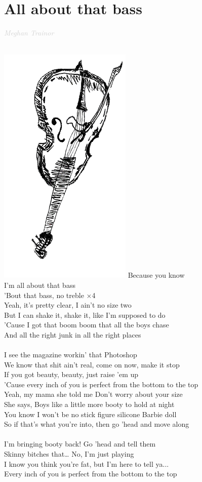 \documentclass[a5paper, 10pt]{book}
\begin{document}
\section{All about that bass}\textcolor{lightgray}{\textit{Meghan Trainor}}\\
\begin{minipage}[t]{0.8\textwidth}
~\\ \includegraphics[height=0.3\textwidth,right]{images/all_about_that_bass_1.png}\vspace*{-0.3\textwidth}
\hspace*{5mm}Because you know\\
\hspace*{5mm}I'm all about that bass\\
\hspace*{5mm}'Bout that bass, no treble \hspace*{15mm}$\times$4\\

Yeah, it's pretty clear, I ain't no size two\\
But I can shake it, shake it, like I'm supposed to do\\
'Cause I got that boom boom that all the boys chase\\
And all the right junk in all the right places\\
\\
I see the magazine workin' that Photoshop\\
We know that shit ain't real, come on now, make it stop\\
If you got beauty, beauty, just raise 'em up\\
'Cause every inch of you is perfect from the bottom to the top\\

\hspace*{3mm}Yeah, my mama she told me Don't worry about your size\\
\hspace*{3mm}She says, Boys like a little more booty to hold at night\\
\hspace*{3mm}You know I won't be no stick figure silicone Barbie doll\\
\hspace*{3mm}So if that's what you're into, then go 'head and move along\\
\\
I'm bringing booty back! Go 'head and tell them\\
Skinny bitches that… No, I'm just playing\\
I know you think you're fat, but I'm here to tell ya...\\
Every inch of you is perfect from the bottom to the top\\
\end{minipage}
\end{document}
